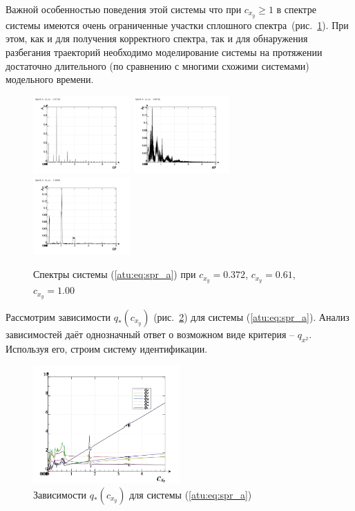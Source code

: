 \documentclass[a4paper,12pt]{article}
\begin{document}
Важной особенностью поведения этой системы что при $ c_{x_y} \ge 1 $
в спектре системы имеются очень ограниченные участки сплошного спектра~(рис.~\ref{atu:f:spr_a_f}).
При этом, как и для получения корректного спектра, так и для обнаружения разбегания траекторий
необходимо моделирование системы на протяжении достаточно длительного
(по сравнению с многими схожими системами) модельного времени.

\begin{figure}[htb!]
\centerline{
  \includegraphics[width=0.33\textwidth]{p/cha/spr_a/sprott_a_f-p_f_cx_y=0x372.png}
  \includegraphics[width=0.33\textwidth]{p/cha/spr_a/sprott_a_f-p_f_cx_y=0x610.png}
  \includegraphics[width=0.33\textwidth]{p/cha/spr_a/sprott_a_f-p_f_cx_y=1x000.png}
}
\caption{Спектры системы (\ref{atu:eq:spr_a})
  при $ c_{x_y} =0.372 $, $ c_{x_y} =0.61 $, $ c_{x_y} =1.00 $
}
\label{atu:f:spr_a_f}
\end{figure}

Рассмотрим зависимости $q_{*}(c_{x_y}) $ (рис.~\ref{atu:f:spr_a_q})
для системы (\ref{atu:eq:spr_a}). Анализ зависимостей
даёт однозначный ответ о возможном виде критерия -- $q_{x^2}$.
Используя его, строим систему идентификации.

\begin{figure}[htb!]
\centerline{
  \includegraphics[width=0.50\textwidth]{p/cha/spr_a/sprott_a_p-p_c_x_y.png}
}
\caption{Зависимости $q_{*}(c_{x_y})$ для системы (\ref{atu:eq:spr_a}) }
\label{atu:f:spr_a_q}
\end{figure}
\end{document}
